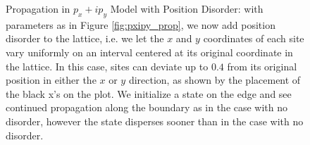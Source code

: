 \documentclass[a4paper]{article}
\begin{document}
\begin{figure}
%
%

%
%
\caption{Propagation in $p_x + ip_y$ Model with Position Disorder: with parameters as in Figure \ref{fig:pxipy_prop}, we now add position disorder to the lattice, i.e. we let the $x$ and $y$ coordinates of each site vary uniformly on an interval centered at its original coordinate in the lattice.
In this case, sites can deviate up to $0.4$ from its original position in either the $x$ or $y$ direction, as shown by the placement of the black x's on the plot.
We initialize a state on the edge and see continued propagation along the boundary as in the case with no disorder, however the state disperses sooner than in the case with no disorder.
}%
\label{fig:pos_dis_prop}%
\end{figure}
\end{document}
